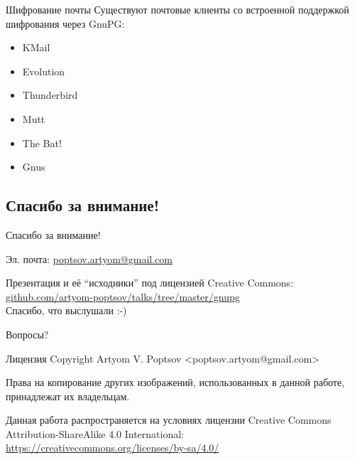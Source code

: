\documentclass[presentation]{beamer}
\begin{document}
\begin{frame}[fragile]{Шифрование почты}
  Существуют почтовые клиенты со встроенной поддержкой шифрования
  через GnuPG:
  \begin{itemize}
  \item KMail
  \item Evolution
  \item Thunderbird
  \item Mutt
  \item The Bat!
  \item Gnus
  \end{itemize}
\end{frame}




\subsection{Спасибо за внимание!}

\begin{frame}{Спасибо за внимание!}
  \large

  Эл. почта: \url{poptsov.artyom@gmail.com}

  \medskip

  Презентация и её ``исходники'' под лицензией Creative Commons:
  \url{github.com/artyom-poptsov/talks/tree/master/gnupg} \\[10pt]

  Спасибо, что выслушали  :-) \\[30pt]

  \bigskip

  \huge Вопросы?
\end{frame}

\begin{frame}{Лицензия}
  Copyright  Artyom V. Poptsov
  <poptsov.artyom@gmail.com> \newline

  Права на копирование других изображений, использованных в данной
  работе, принадлежат их владельцам. \newline

  Данная работа распространяется на условиях лицензии Creative Commons
  Attribution-ShareAlike 4.0 International:
  \url{https://creativecommons.org/licenses/by-sa/4.0/}
\end{frame}
\end{document}
